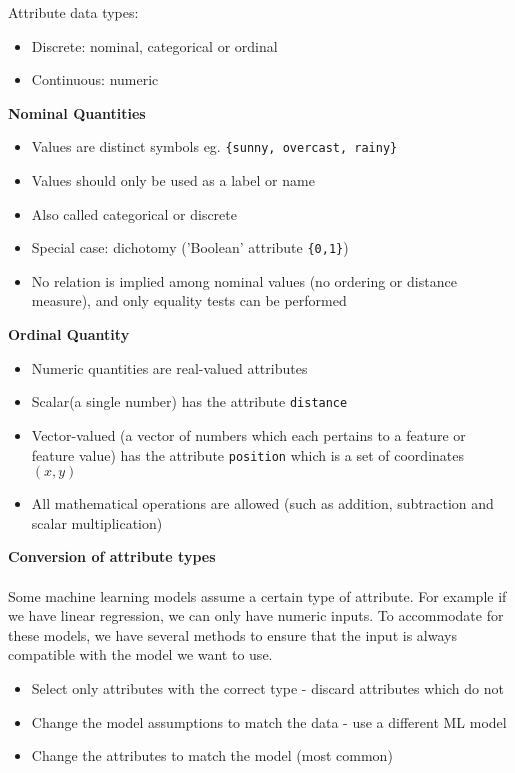 \documentclass[a4paper,10pt]{article}
\begin{document}
Attribute data types: 
\begin{itemize}
	\item Discrete: nominal, categorical or ordinal 
	\item Continuous: numeric \\
\end{itemize}
\textcolor{Periwinkle}{\textbf{Nominal Quantities}}
\begin{itemize}
	\item Values are distinct symbols eg. \texttt{\{sunny, overcast, rainy\}}
	\item Values should only be used as a label or name
	\item Also called categorical or discrete
	\item Special case: dichotomy ('Boolean' attribute \texttt{\{0,1\}})
	\item No relation is implied among nominal values (no ordering or distance measure), and only equality tests can be performed \\
\end{itemize}
\textcolor{Periwinkle}{\textbf{Ordinal Quantity}}
\begin{itemize}
	\item Numeric quantities are real-valued attributes 
	\item Scalar(a single number) has the attribute \texttt{distance}
	\item Vector-valued (a vector of numbers which each pertains to a feature or feature value) has the attribute \texttt{position} which is a set of coordinates $(x,y)$ 
	\item All mathematical operations are allowed (such as addition, subtraction and scalar multiplication) \\
\end{itemize}
\textcolor{Periwinkle}{\textbf{Conversion of attribute types}}\\\\
Some machine learning models assume a certain type of attribute. For example if we have linear regression, we can only have numeric inputs. To accommodate for these models, we have several methods to ensure that the input is always compatible with the model we want to use. 
\begin{itemize}
	\item Select only attributes with the correct type - discard attributes which do not 
	\item Change the model assumptions to match the data - use a different ML model 
	\item Change the attributes to match the model (most common) \\
\end{itemize}
\end{document}
